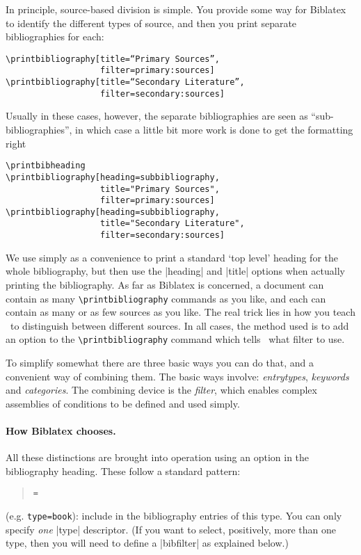 In principle, source-based division is simple. You provide some way for
Biblatex to identify the different types of source, and then you print
separate bibliographies for each:

\begin{Verbatim}
\printbibliography[title=“Primary Sources”,
                   filter=primary:sources]
\printbibliography[title=“Secondary Literature”,
                   filter=secondary:sources]
\end{Verbatim}
Usually in these cases, however, the separate bibliographies are seen
as ``sub-bibliographies'', in which case a little bit more work is
done to get the formatting right

\begin{Verbatim}
\printbibheading
\printbibliography[heading=subbibliography,
                   title="Primary Sources",
                   filter=primary:sources]
\printbibliography[heading=subbibliography,
                   title="Secondary Literature",
                   filter=secondary:sources]
\end{Verbatim}
We use  simply as a convenience to print a
standard `top level' heading for the whole bibliography, but then use
the |heading| and |title| options when actually printing the
bibliography. As far as Biblatex is concerned, a document can contain
as many \texttt{\textbackslash{}printbibliography} commands as you
like, and each can contain as many or as few sources as you like.  The
real trick lies in how you teach \biblatex\ to distinguish between
different sources. In all cases, the method used is to add an option
to the \texttt{\textbackslash{}printbibliography} command which tells
\biblatex\ what filter to use.

To simplify somewhat there are three basic ways you can do that, and a
convenient way of combining them. The basic ways involve:
\emph{entrytypes}, \emph{keywords} and \emph{categories}. The
combining device is the \emph{filter}, which enables complex
assemblies of conditions to be defined and used simply.

\paragraph{How Biblatex chooses.} All these distinctions are brought
into operation using an option in the bibliography heading. These
follow a standard pattern:
\begin{quote}
 \texttt{=} 
\end{quote}
(e.g. \texttt{type=book}): include in the bibliography entries of this
type. You can only specify \emph{one} |type| descriptor. (If you want
to select, positively, more than one type, then you will need to
define a |bibfilter| as explained below.)

